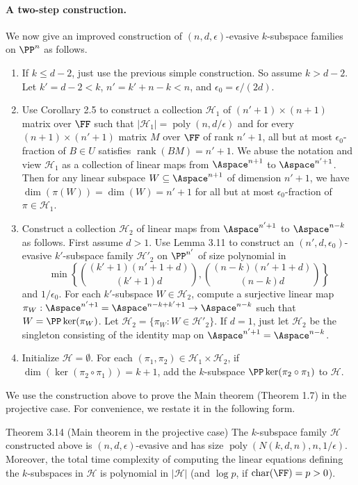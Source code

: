 \paragraph{A two-step construction.}
We now give an improved construction of $(n,d,\epsilon)$-evasive $k$-subspace families on $\PP^n$ as follows.
\begin{enumerate}
\item If $k\le d-2$, just use the previous simple construction. So assume $k>d-2$. Let $k'=d-2<k$, $n'=k'+n-k<n$, and $\epsilon_0=\epsilon/(2d)$.
\item Use Corollary 2.5 to construct a collection $\mathcal H_1$ of $(n'+1)\times(n+1)$ matrix over $\FF$ such that $|\mathcal H_1|=\operatorname{poly}(n,d/\epsilon)$ and for every $(n+1)\times(n'+1)$ matrix $M$ over $\FF$ of rank $n'+1$, all but at most $\epsilon_0$-fraction of $B\in U$ satisfies $\operatorname{rank}(BM)=n'+1$.
We abuse the notation and view $\mathcal H_1$ as a collection of linear maps from $\Aspace^{n+1}$ to $\Aspace^{n'+1}$. Then for any linear subspace $W\subseteq\Aspace^{n+1}$ of dimension $n'+1$, we have $\dim(\pi(W))=\dim(W)=n'+1$ for all but at most $\epsilon_0$-fraction of $\pi\in\mathcal H_1$.
\item Construct a collection $\mathcal H_2$ of linear maps from $\Aspace^{n'+1}$ to $\Aspace^{n-k}$ as follows. First assume $d>1$. Use Lemma 3.11 to construct an $(n',d,\epsilon_0)$-evasive $k'$-subspace family $\mathcal H'_2$ on $\PP^{n'}$ of size polynomial in
\[\min\left\{\binom{(k'+1)(n'+1+d)}{(k'+1)d},\binom{(n-k)(n'+1+d)}{(n-k)d}\right\}\]
and $1/\epsilon_0$. For each $k'$-subspace $W\in\mathcal H_2$, compute a surjective linear map $\pi_W:\Aspace^{n'+1}=\Aspace^{n-k+k'+1}\to\Aspace^{n-k}$ such that $W=\PP\ker(\pi_W)$. Let $\mathcal H_2=\{\pi_W:W\in\mathcal H'_2\}$.
If $d=1$, just let $\mathcal H_2$ be the singleton consisting of the identity map on $\Aspace^{n'+1}=\Aspace^{n-k}$.
\item Initialize $\mathcal H=\emptyset$. For each $(\pi_1,\pi_2)\in\mathcal H_1\times\mathcal H_2$, if $\dim(\ker(\pi_2\circ\pi_1))=k+1$, add the $k$-subspace $\PP\ker(\pi_2\circ\pi_1)$ to $\mathcal H$.
\end{enumerate}
We use the construction above to prove the Main theorem (Theorem 1.7) in the projective case. For convenience, we restate it in the following form.
\begin{result}{Theorem 3.14 (Main theorem in the projective case)}
The $k$-subspace family $\mathcal H$ constructed above is $(n,d,\epsilon)$-evasive and has size $\operatorname{poly}(N(k,d,n),n,1/\epsilon)$. Moreover, the total time complexity of computing the linear equations defining the $k$-subspaces in $\mathcal H$ is polynomial in $|\mathcal H|$ (and $\log p$, if $\operatorname{char}(\FF)=p>0$).
\end{result}
